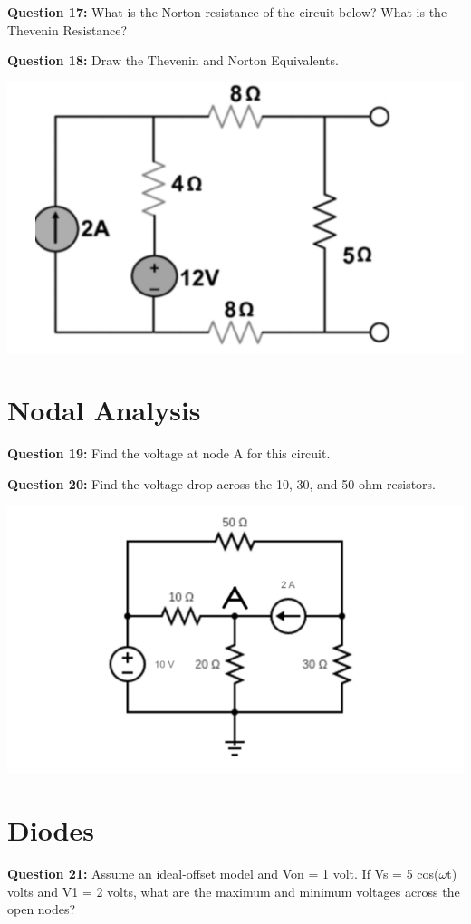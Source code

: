 \documentclass{article}
\begin{document}
\textbf{Question 17:} What is the Norton resistance of the circuit below? What is the Thevenin Resistance?

\textbf{Question 18:} Draw the Thevenin and Norton Equivalents.

\begin{center}
    \includegraphics[width=0.75\linewidth]{figures/23.png}

\end{center}

\section*{Nodal Analysis}
\textbf{Question 19:} Find the voltage at node A for this circuit.

\textbf{Question 20:} Find the voltage drop across the 10, 30, and 50 ohm resistors.

\begin{center}
    \includegraphics[width=0.75\linewidth]{figures/34.png}
\end{center}

\pagebreak

\section*{Diodes}
\textbf{Question 21:} Assume an ideal-offset model and Von = 1 volt. If Vs = 5 cos(\(\omega\)t) volts and V1 = 2 volts, what are the maximum and minimum voltages across the open nodes?
\end{document}
